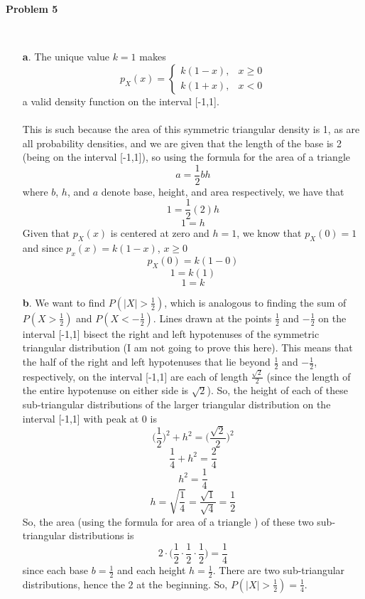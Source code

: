 \textbf{Problem 5}

 
\begin{solution}\ 
\begin{itemize}

 \item[\textbf{a}.] The unique value $k = 1$ makes 
 \[p_X(x) = \begin{cases}\text{$k(1-x)$}, & \text{$x \geq 0$}\\\text{$k(1+x)$}, & \text{$x<0$}\end{cases}\]
 a valid density function on the interval [-1,1].\\ \\
 This is such because the area of this symmetric triangular density is 1, as are all probability densities, and we are given that the length of the base is 2 (being on the interval [-1,1]), so using the formula for the area of a triangle
 \[a = \frac{1}{2}bh\]
 where $b$, $h$, and $a$ denote base, height, and area respectively, we have that
 \[1 = \frac{1}{2}(2)h\]
 \[1 = h\]
 Given that $p_X(x)$ is centered at zero and $h = 1$, we know that $p_X(0) = 1$ and since $p_x(x) = k(1 -x)$, $x \geq 0$
 \[p_X(0) = k(1 - 0)\]
  \[1 = k(1)\]
  \[1 = k\]
 
 \item[\textbf{b}.] We want to find $P(|X| > \frac{1}{2})$, which is analogous to finding the sum of $P(X > \frac{1}{2})$ and $P(X < -\frac{1}{2})$. Lines drawn at the points $\frac{1}{2}$ and $-\frac{1}{2}$ on the interval [-1,1] bisect the right and left hypotenuses of the symmetric triangular distribution (I am not going to prove this here). This means that the half of the right and left hypotenuses that lie beyond $\frac{1}{2}$ and $-\frac{1}{2}$, respectively, on the interval [-1,1] are each of length $\frac{\sqrt{2}}{2}$ (since the length of the entire hypotenuse on either side is $\sqrt2$). So, the height of each of these sub-triangular distributions of the larger triangular distribution on the interval [-1,1] with peak at 0 is
 $$\bigg(\frac{1}{2}\bigg)^2 + h^2 = \bigg(\frac{\sqrt{2}}{2}\bigg)^2$$
 $$\frac{1}{4} + h^2 = \frac{2}{4}$$
 $$h^2 = \frac{1}{4}$$
 $$h = \sqrt{\frac{1}{4}} = \frac{\sqrt{1}}{\sqrt{4}}=\frac{1}{2}$$
 So, the area (using the formula for area of a triangle ) of these two sub-triangular distributions is
 $$2\cdot \bigg(\frac{1}{2}\cdot\frac{1}{2}\cdot\frac{1}{2}\bigg) = \frac{1}{4} $$
 since each base $b = \frac{1}{2}$ and each height $h = \frac{1}{2}$. There are two sub-triangular distributions, hence the $2$ at the beginning. So, $P(|X| > \frac{1}{2}) = \frac{1}{4}$.
   
 \end{itemize}
\end{solution}
